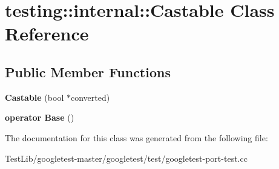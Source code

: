 \hypertarget{classtesting_1_1internal_1_1Castable}{}\section{testing\+:\+:internal\+:\+:Castable Class Reference}
\label{classtesting_1_1internal_1_1Castable}
\subsection*{Public Member Functions}
\begin{DoxyCompactItemize}
\item 
\mbox{\label{classtesting_1_1internal_1_1Castable_a705d519a227d38ff5c174905316f62c4}} 
{\bfseries Castable} (bool $\ast$converted)
\item 
\mbox{\label{classtesting_1_1internal_1_1Castable_ac60b2e7885f3b09defb829eddaa0afd9}} 
{\bfseries operator Base} ()
\end{DoxyCompactItemize}


The documentation for this class was generated from the following file\+:\begin{DoxyCompactItemize}
\item 
Test\+Lib/googletest-\/master/googletest/test/googletest-\/port-\/test.\+cc\end{DoxyCompactItemize}
